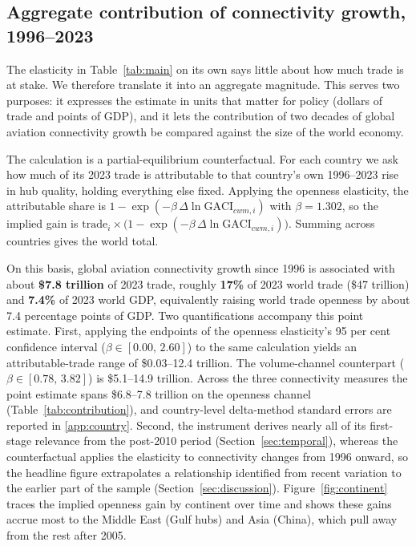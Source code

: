 \subsection{Aggregate contribution of connectivity growth, 1996--2023}
\label{sec:aggregate}
The elasticity in Table~\ref{tab:main} on its own says little about how much trade is at stake. We therefore translate it into an aggregate magnitude. This serves two purposes: it expresses the estimate in units that matter for policy (dollars of trade and points of GDP), and it lets the contribution of two decades of global aviation connectivity growth be compared against the size of the world economy.

The calculation is a partial-equilibrium counterfactual. For each country we ask how much of its 2023 trade is attributable to that country's own 1996--2023 rise in hub quality, holding everything else fixed. Applying the openness elasticity, the attributable share is $1-\exp(-\beta\,\Delta\ln\mathrm{GACI}_{cwm,i})$ with $\beta=1.302$, so the implied gain is $\text{trade}_i\times\bigl(1-\exp(-\beta\,\Delta\ln\mathrm{GACI}_{cwm,i})\bigr)$. Summing across countries gives the world total.

On this basis, global aviation connectivity growth since 1996 is associated with about \textbf{\$7.8 trillion} of 2023 trade, roughly \textbf{17\%} of 2023 world trade (\$47 trillion) and \textbf{7.4\%} of 2023 world GDP, equivalently raising
world trade openness by about 7.4 percentage points of GDP. Two quantifications accompany this point estimate. First, applying the endpoints of the openness elasticity's 95 per cent confidence interval
($\beta\in[0.00,\,2.60]$) to the same calculation yields an attributable-trade range of \$0.03--12.4 trillion. The volume-channel counterpart ($\beta\in[0.78,\,3.82]$) is \$5.1--14.9 trillion. Across the three connectivity measures the point estimate spans \$6.8--7.8 trillion on the openness channel (Table~\ref{tab:contribution}), and country-level delta-method standard errors are reported in \ref{app:country}. Second, the instrument derives nearly all of its first-stage relevance from the post-2010 period (Section~\ref{sec:temporal}), whereas the counterfactual applies the elasticity to connectivity changes from 1996 onward, so the headline figure extrapolates a relationship identified from recent variation to the earlier part of the sample (Section~\ref{sec:discussion}). Figure~\ref{fig:continent} traces the implied openness gain by continent over time and shows these gains accrue most to the Middle East (Gulf hubs) and Asia (China), which pull away from the rest after 2005.

